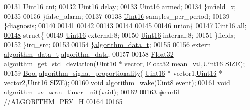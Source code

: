 \begin{DoxyCode}
00131                 \hyperlink{a00066_a59a9f6be4562c327cbfb4f7e8e18f08b}{Uint16}                 cnt;
00132                 \hyperlink{a00066_a59a9f6be4562c327cbfb4f7e8e18f08b}{Uint16}                 delay;
00133                 \hyperlink{a00066_a59a9f6be4562c327cbfb4f7e8e18f08b}{Uint16}                 armed;
00134             \}mfield\_x;
00135 
00136     \}false\_alarm;
00137 
00138       \hyperlink{a00066_a59a9f6be4562c327cbfb4f7e8e18f08b}{Uint16}  samples\_per\_period;
00139     \}diagnosis;
00140    
00141 
00142 
00143 
00144     
00145 
\hypertarget{a00010_source_l00146}{}\hyperlink{a00010}{00146}     \textcolor{keyword}{union}\{
00147         \hyperlink{a00066_a59a9f6be4562c327cbfb4f7e8e18f08b}{Uint16} all;
\hypertarget{a00010_source_l00148}{}\hyperlink{a00010}{00148}         \textcolor{keyword}{struct}\{
00149             \hyperlink{a00066_a59a9f6be4562c327cbfb4f7e8e18f08b}{Uint16} external:8;
00150             \hyperlink{a00066_a59a9f6be4562c327cbfb4f7e8e18f08b}{Uint16} \textcolor{keyword}{internal}:8;
00151         \}fields;
00152     \}irq\_src;
00153    
00154 \}\hyperlink{a00010_da/d82/a00091}{algorithm\_data\_t};
00155 
00156 \textcolor{keyword}{extern} \hyperlink{a00010_da/d82/a00091}{algorithm\_data\_t} \hyperlink{a00010_a183caa40cd01e79ee309cc9c4a225197}{algorithm\_data};
00157 
00158 \hyperlink{a00066_a87d38f886e617ced2698fc55afa07637}{Float32}     \hyperlink{a00010_a97eb6437dda088f144d791e49cd3dc2a}{algorithm\_get\_std\_deviation}(\hyperlink{a00066_a59a9f6be4562c327cbfb4f7e8e18f08b}{Uint16} * vector,
      \hyperlink{a00066_a87d38f886e617ced2698fc55afa07637}{Float32} mean\_val,\hyperlink{a00066_a59a9f6be4562c327cbfb4f7e8e18f08b}{Uint16} SIZE);
00159 \hyperlink{a00066_a253b248072cfc8bd812c69acd0046eed}{Bool}        \hyperlink{a00010_a2925c58a9c3f5d3c957eaca9a95a6c3a}{algorithm\_signal\_proportionality}(
      \hyperlink{a00066_a59a9f6be4562c327cbfb4f7e8e18f08b}{Uint16} * vector1,\hyperlink{a00066_a59a9f6be4562c327cbfb4f7e8e18f08b}{Uint16} * vector2,\hyperlink{a00066_a59a9f6be4562c327cbfb4f7e8e18f08b}{Uint16} SIZE);
00160 \textcolor{keywordtype}{void}        \hyperlink{a00010_a42ed16c7ef20e0c0031fe7ba7ae377b3}{algorithm\_wake}(\hyperlink{a00066_af84840501dec18061d18a68c162a8fa2}{Uint8} event);
00161 \textcolor{keywordtype}{void}        \hyperlink{a00010_ab898d2d804c49cb0978d26f6af64e0e4}{algorithm\_sv\_scan\_timer\_init}(\textcolor{keywordtype}{void});
00162 
00163 \textcolor{preprocessor}{#endif //ALGORITHM\_PRV\_H}
00164 
00165 
\end{DoxyCode}
